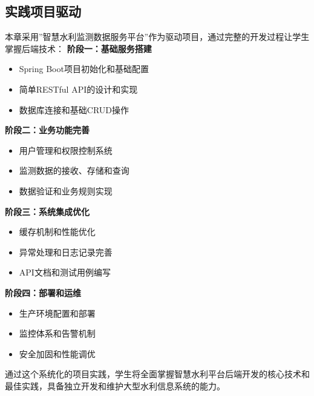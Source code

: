 \subsection{实践项目驱动}\label{ux5b9eux8df5ux9879ux76eeux9a71ux52a8} 本章采用''智慧水利监测数据服务平台''作为驱动项目，通过完整的开发过程让学生掌握后端技术：
\textbf{阶段一：基础服务搭建} \begin{itemize} \tightlist \item Spring Boot项目初始化和基础配置 \item 简单RESTful API的设计和实现 \item
数据库连接和基础CRUD操作 \end{itemize} \textbf{阶段二：业务功能完善} \begin{itemize} \tightlist \item 用户管理和权限控制系统 \item 监测数据的接收、存储和查询 \item
数据验证和业务规则实现 \end{itemize} \textbf{阶段三：系统集成优化} \begin{itemize} \tightlist \item 缓存机制和性能优化 \item 异常处理和日志记录完善 \item
API文档和测试用例编写 \end{itemize} \textbf{阶段四：部署和运维} \begin{itemize} \tightlist \item 生产环境配置和部署 \item 监控体系和告警机制 \item 安全加固和性能调优
\end{itemize} 通过这个系统化的项目实践，学生将全面掌握智慧水利平台后端开发的核心技术和最佳实践，具备独立开发和维护大型水利信息系统的能力。
